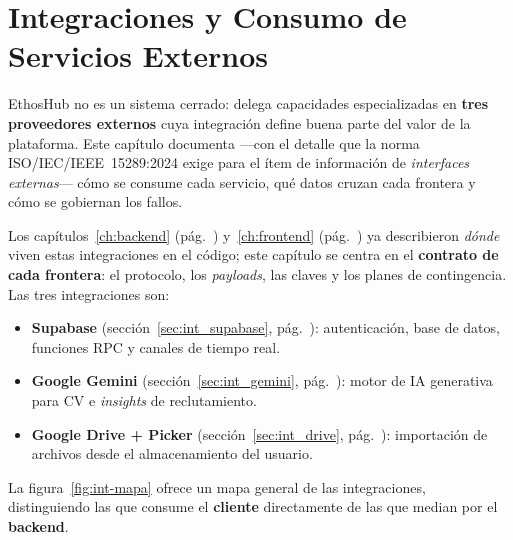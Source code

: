 \chapter{Integraciones y Consumo de Servicios Externos}
\label{ch:integraciones}

EthosHub no es un sistema cerrado: delega capacidades especializadas en \textbf{tres
proveedores externos} cuya integración define buena parte del valor de la plataforma. Este
capítulo documenta —con el detalle que la norma ISO/IEC/IEEE~15289:2024 exige para el ítem
de información de \textit{interfaces externas}— cómo se consume cada servicio, qué datos
cruzan cada frontera y cómo se gobiernan los fallos.

Los capítulos~\ref{ch:backend} (pág.~\pageref{ch:backend}) y~\ref{ch:frontend}
(pág.~\pageref{ch:frontend}) ya describieron \textit{dónde} viven estas integraciones en el
código; este capítulo se centra en el \textbf{contrato de cada frontera}: el protocolo, los
\textit{payloads}, las claves y los planes de contingencia. Las tres integraciones son:

\begin{itemize}[noitemsep]
    \item \textbf{Supabase} (sección~\ref{sec:int_supabase}, pág.~\pageref{sec:int_supabase}):
    autenticación, base de datos, funciones RPC y canales de tiempo real.
    \item \textbf{Google Gemini} (sección~\ref{sec:int_gemini}, pág.~\pageref{sec:int_gemini}):
    motor de IA generativa para CV e \textit{insights} de reclutamiento.
    \item \textbf{Google Drive + Picker} (sección~\ref{sec:int_drive},
    pág.~\pageref{sec:int_drive}): importación de archivos desde el almacenamiento del usuario.
\end{itemize}

La figura~\ref{fig:int-mapa} ofrece un mapa general de las integraciones, distinguiendo
las que consume el \textbf{cliente} directamente de las que median por el \textbf{backend}.

